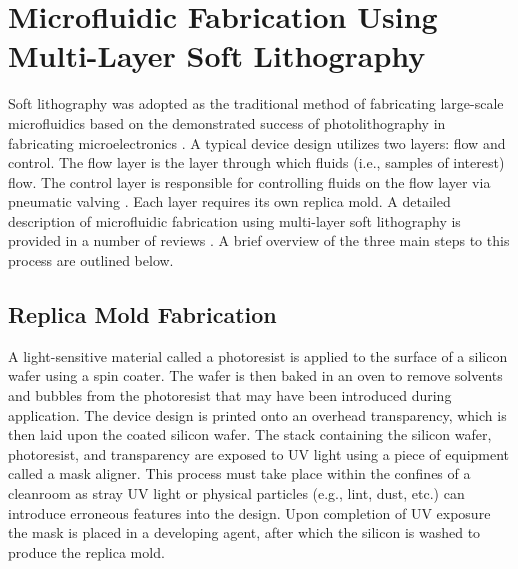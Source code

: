 \section{Microfluidic Fabrication Using Multi-Layer Soft Lithography}
\label{ssec:backgroundSL}
Soft lithography was adopted as the traditional method of fabricating large-scale microfluidics based on the demonstrated success of photolithography in fabricating microelectronics \cite{whitesides2006}. A typical device design utilizes two layers: flow and control. The flow layer is the layer through which fluids (i.e., samples of interest) flow. The control layer is responsible for controlling fluids on the flow layer via pneumatic valving \cite{unger2000}. Each layer requires its own replica mold. A detailed description of microfluidic fabrication using multi-layer soft lithography is provided in a number of reviews \cite{duffy1998}\cite{sia2003}\cite{weibel2007}. A brief overview of the three main steps to this process are outlined below.

\subsection{Replica Mold Fabrication}
A light-sensitive material called a photoresist is applied to the surface of a silicon wafer using a spin coater. The wafer is then baked in an oven to remove solvents and bubbles from the photoresist that may have been introduced during application. The device design is printed onto an overhead transparency, which is then laid upon the coated silicon wafer. The stack containing the silicon wafer, photoresist, and transparency are exposed to UV light using a piece of equipment called a mask aligner. This process must take place within the confines of a cleanroom as stray UV light or physical particles (e.g., lint, dust, etc.) can introduce erroneous features into the design. Upon completion of UV exposure the mask is placed in a developing agent, after which the silicon is washed to produce the replica mold.

